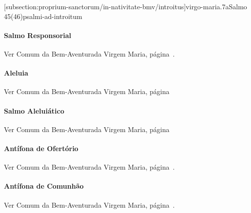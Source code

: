 \def\Prefix{subsection:proprium-sanctorum/in-nativitate-bmv}

[\Prefix/introitus]{virgo-maria.7a}{Salmo 45(46)}{psalmi-ad-introitum}

\paragraph{Salmo Responsorial}
\begin{rubrica}
  Ver Comum da Bem-Aventurada Virgem Maria, página~\pageref{subsection:communia/commune-bmv/psalmus-responsorius}.
\end{rubrica}

\paragraph{Aleluia}
\begin{rubrica}
  Ver Comum da Bem-Aventurada Virgem Maria, página~\pageref{subsection:communia/commune-bmv/alleluia}
\end{rubrica}

\paragraph{Salmo Aleluiático}
\begin{rubrica}
  Ver Comum da Bem-Aventurada Virgem Maria, página~\pageref{subsection:communia/commune-bmv/psalmus-alleluiaticus}
\end{rubrica}

\paragraph{Antífona de Ofertório}
\begin{rubrica}
  Ver Comum da Bem-Aventurada Virgem Maria, página~\pageref{subsection:communia/commune-bmv/offertorium}.
\end{rubrica}

\paragraph{Antífona de Comunhão}
\begin{rubrica}
  Ver Comum da Bem-Aventurada Virgem Maria, página~\pageref{subsection:communia/commune-bmv/communio-1}.
\end{rubrica}

\AllowPageFlush